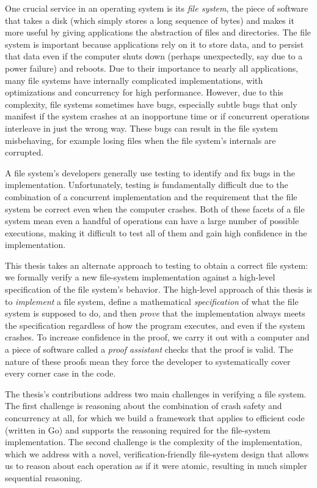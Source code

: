 One crucial service in an operating system is its \emph{file system}, the piece
of software that takes a disk (which simply stores a long sequence of bytes) and
makes it more useful by giving applications the abstraction of files and directories. The file
system is important because applications rely on it to store data, and to
persist that data even if the computer shuts down (perhaps unexpectedly, say due
to a power failure) and reboots. Due to their importance to nearly all applications, many
file systems have internally complicated implementations, with optimizations and
concurrency for high performance. However, due to this complexity, file systems
sometimes have bugs, especially subtle bugs that only manifest if the system
crashes at an inopportune time or if concurrent operations interleave in just
the wrong way. These bugs can result in the file system misbehaving, for example
losing files when the file system's internals are corrupted.

A file system's developers generally use testing to identify and fix bugs in the
implementation. Unfortunately, testing is fundamentally difficult due to the
combination of a concurrent implementation and the requirement that the file
system be correct even when the computer crashes. Both of these facets of a file
system mean even a handful of operations can have a large number of possible
executions, making it difficult to test all of them and gain high confidence in the
implementation.

This thesis takes an alternate approach to testing to obtain a correct file
system: we formally verify a new file-system implementation against a high-level
specification of the file system's behavior. The high-level approach of this
thesis is to \emph{implement} a file system, define a mathematical
\emph{specification} of what the file system is supposed to do, and then
\emph{prove} that the implementation always meets the specification regardless
of how the program executes, and even if the system crashes. To increase confidence in
the proof, we carry it out with a computer and a piece of software called a
\emph{proof assistant} checks that the proof is valid. The nature of these
proofs mean they force the developer to systematically cover every corner case
in the code.

The thesis's contributions address two main challenges in verifying a file system. The
first challenge is reasoning about the combination of crash safety and
concurrency at all, for which we build a framework that applies to efficient
code (written in Go) and supports the reasoning required for the file-system implementation.
The second challenge is the complexity of the implementation, which we address
with a novel, verification-friendly file-system design that allows us to reason
about each operation as if it were atomic, resulting in much simpler sequential reasoning.

